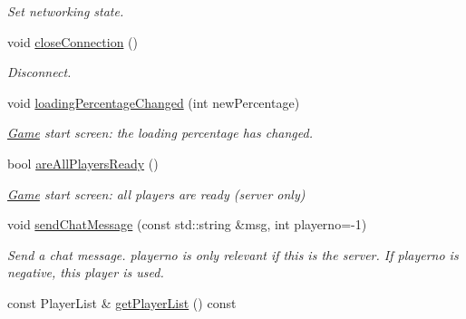 \begin{DoxyCompactItemize}
\begin{DoxyCompactList}\small\item\em \-Set networking state. \end{DoxyCompactList}\item 
\hypertarget{classNetwork_a721c9fc65b0221ba1cfae46d73b8e417}{
void \hyperlink{classNetwork_a721c9fc65b0221ba1cfae46d73b8e417}{close\-Connection} ()}
\label{d5/d16/classNetwork_a721c9fc65b0221ba1cfae46d73b8e417}

\begin{DoxyCompactList}\small\item\em \-Disconnect. \end{DoxyCompactList}\item 
\hypertarget{classNetwork_a0ceadd8cd7b3cebd68ecc63648f4e4f1}{
void \hyperlink{classNetwork_a0ceadd8cd7b3cebd68ecc63648f4e4f1}{loading\-Percentage\-Changed} (int new\-Percentage)}
\label{d5/d16/classNetwork_a0ceadd8cd7b3cebd68ecc63648f4e4f1}

\begin{DoxyCompactList}\small\item\em \hyperlink{classGame}{\-Game} start screen\-: the loading percentage has changed. \end{DoxyCompactList}\item 
\hypertarget{classNetwork_a5d10e938ea117fc254033ad911843cb9}{
bool \hyperlink{classNetwork_a5d10e938ea117fc254033ad911843cb9}{are\-All\-Players\-Ready} ()}
\label{d5/d16/classNetwork_a5d10e938ea117fc254033ad911843cb9}

\begin{DoxyCompactList}\small\item\em \hyperlink{classGame}{\-Game} start screen\-: all players are ready (server only) \end{DoxyCompactList}\item 
\hypertarget{classNetwork_a2f36a5683e8bcf83ce767c79a92c507b}{
void \hyperlink{classNetwork_a2f36a5683e8bcf83ce767c79a92c507b}{send\-Chat\-Message} (const std\-::string \&msg, int playerno=-\/1)}
\label{d5/d16/classNetwork_a2f36a5683e8bcf83ce767c79a92c507b}

\begin{DoxyCompactList}\small\item\em \-Send a chat message. playerno is only relevant if this is the server. \-If playerno is negative, this player is used. \end{DoxyCompactList}\item 
\hypertarget{classNetwork_a37295c10288c1435a734d2a437188e9a}{
const \-Player\-List \& \hyperlink{classNetwork_a37295c10288c1435a734d2a437188e9a}{get\-Player\-List} () const }
\label{d5/d16/classNetwork_a37295c10288c1435a734d2a437188e9a}


\end{DoxyCompactItemize}
